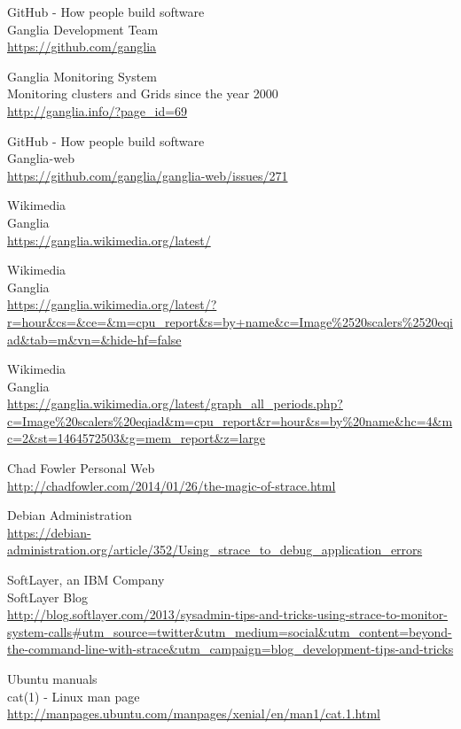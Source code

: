 \begin{thebibliography}{10}
GitHub - How people build software\\
Ganglia Development Team\\
  \url{https://github.com/ganglia}

Ganglia Monitoring System\\
Monitoring clusters and Grids since the year 2000\\
  \url{http://ganglia.info/?page_id=69}

GitHub - How people build software\\
Ganglia-web\\
  \url{https://github.com/ganglia/ganglia-web/issues/271}

Wikimedia\\
Ganglia\\
  \url{https://ganglia.wikimedia.org/latest/}

Wikimedia\\
Ganglia\\
  \url{https://ganglia.wikimedia.org/latest/?r=hour&cs=&ce=&m=cpu_report&s=by+name&c=Image\%2520scalers\%2520eqiad&tab=m&vn=&hide-hf=false}

Wikimedia\\
Ganglia\\
  \url{https://ganglia.wikimedia.org/latest/graph_all_periods.php?c=Image\%20scalers\%20eqiad&m=cpu_report&r=hour&s=by\%20name&hc=4&mc=2&st=1464572503&g=mem_report&z=large}

Chad Fowler Personal Web\\
  \url{http://chadfowler.com/2014/01/26/the-magic-of-strace.html}

Debian Administration\\
  \url{https://debian-administration.org/article/352/Using_strace_to_debug_application_errors}

SoftLayer, an IBM Company\\
SoftLayer Blog\\
  \url{http://blog.softlayer.com/2013/sysadmin-tips-and-tricks-using-strace-to-monitor-system-calls#utm_source=twitter&utm_medium=social&utm_content=beyond-the-command-line-with-strace&utm_campaign=blog_development-tips-and-tricks}

Ubuntu manuals\\
cat(1) - Linux man page\\
  \url{http://manpages.ubuntu.com/manpages/xenial/en/man1/cat.1.html}

\end{thebibliography}
